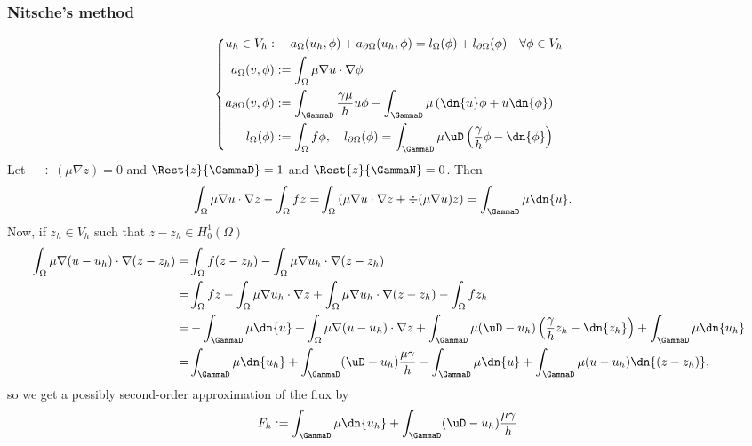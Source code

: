 \subsubsection{Nitsche's method}
%
%
\begin{equation}\label{eq:laplace:weakform}
%
\left\{
\begin{aligned}
&u_h\in V_h:\quad a_{\Omega}(u_h, \phi) + a_{\partial\Omega}(u_h,\phi) = l_{\Omega}(\phi)+l_{\partial\Omega}(\phi) \quad\forall \phi\in V_h\\
&\begin{aligned}
a_{\Omega}(v,\phi) &:= \int_{\Omega} \mu \nabla u\cdot\nabla\phi \\
 a_{\partial\Omega}(v,\phi) &:= \int_{\GammaD}\frac{\gamma\mu}{h}u\phi - 
 \int_{\GammaD}\mu \left(  \dn{u} \phi + u  \dn{\phi}\right) \\
 l_{\Omega}(\phi) &:= \int_{\Omega} f\phi, \quad
 l_{\partial\Omega}(\phi) = \int_{\GammaD}\mu\uD\left( \frac{\gamma}{h}\phi - \dn{\phi}\right)
\end{aligned}
\end{aligned}
\right.
%
\end{equation}
%
Let $-\div(\mu \nabla z)= 0$ and $\Rest{z}{\GammaD}=1$ and $\Rest{z}{\GammaN}=0$. Then
%
\begin{align*}
\int_{\Omega} \mu \nabla u\cdot\nabla z -\int_{\Omega} fz =&  \int_{\Omega} \left( \mu \nabla u\cdot\nabla z + \div(\mu \nabla u)z\right) 
= \int_{\GammaD}\mu\dn{u}.
\end{align*}
%
Now, if $z_h\in V_h$ such that $z-z_h\in H^1_0(\Omega)$ 
%
\begin{align*}
\int_{\Omega} \mu \nabla (u-u_h)\cdot\nabla(z-z_h) =& \int_{\Omega} f(z-z_h) -\int_{\Omega} \mu \nabla u_h\cdot\nabla(z-z_h)\\
=&\int_{\Omega} fz - \int_{\Omega} \mu \nabla u_h\cdot\nabla z + \int_{\Omega} \mu \nabla u_h\cdot\nabla(z-z_h) -\int_{\Omega} fz_h\\
=&-\int_{\GammaD}\mu\dn{u}+ \int_{\Omega} \mu \nabla (u-u_h)\cdot\nabla z 
+ \int_{\GammaD}\mu(\uD-u_h)\left( \frac{\gamma}{h}z_h - \dn{z_h}\right)+ \int_{\GammaD}\mu \dn{u_h}\\
=&\int_{\GammaD}\mu \dn{u_h}+ \int_{\GammaD}(\uD-u_h)\frac{\mu\gamma}{h} -\int_{\GammaD}\mu\dn{u}
+ \int_{\GammaD}\mu(u-u_h) \dn{(z-z_h)},
\end{align*}
%
so we get a possibly second-order approximation of the flux by
%
\begin{equation}\label{eq:}
F_h := \int_{\GammaD}\mu \dn{u_h}+ \int_{\GammaD}(\uD-u_h)\frac{\mu\gamma}{h}.
\end{equation}
%
%
